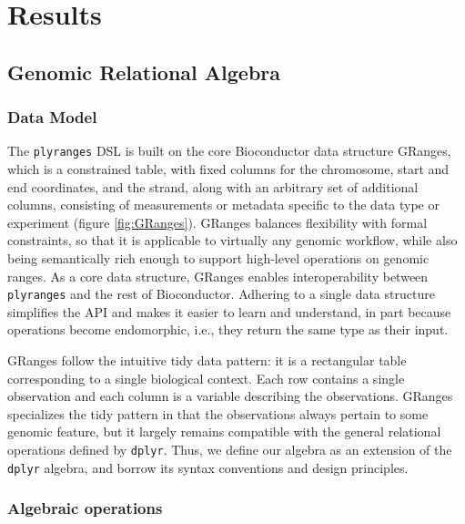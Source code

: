 \documentclass[]{article}
\begin{document}
\hypertarget{results}{%
\section{Results}\label{results}}

\hypertarget{genomic-relational-algebra}{%
\subsection{Genomic Relational
Algebra}\label{genomic-relational-algebra}}

\hypertarget{data-model}{%
\subsubsection{Data Model}\label{data-model}}

The \texttt{plyranges} DSL is built on the core Bioconductor data
structure GRanges, which is a constrained table, with fixed columns for
the chromosome, start and end coordinates, and the strand, along with an
arbitrary set of additional columns, consisting of measurements or
metadata specific to the data type or experiment (figure
\ref{fig:GRanges}). GRanges balances flexibility with formal
constraints, so that it is applicable to virtually any genomic workflow,
while also being semantically rich enough to support high-level
operations on genomic ranges. As a core data structure, GRanges enables
interoperability between \texttt{plyranges} and the rest of
Bioconductor. Adhering to a single data structure simplifies the API and
makes it easier to learn and understand, in part because operations
become endomorphic, i.e., they return the same type as their input.

GRanges follow the intuitive tidy data pattern: it is a rectangular
table corresponding to a single biological context. Each row contains a
single observation and each column is a variable describing the
observations. GRanges specializes the tidy pattern in that the
observations always pertain to some genomic feature, but it largely
remains compatible with the general relational operations defined by
\texttt{dplyr}. Thus, we define our algebra as an extension of the
\texttt{dplyr} algebra, and borrow its syntax conventions and design
principles.


\hypertarget{algebraic-operations}{%
\subsubsection{Algebraic operations}\label{algebraic-operations}}
\end{document}
